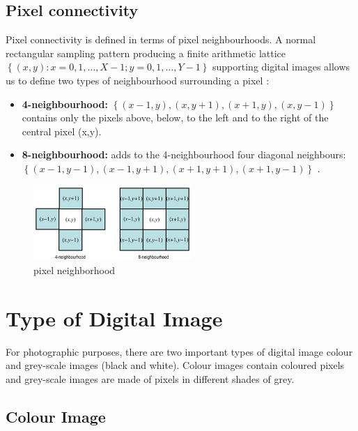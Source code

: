 \subsection{Pixel connectivity}\label{subsec:pixel-connectivity}

Pixel connectivity is defined in terms of pixel neighbourhoods.
A normal rectangular sampling pattern producing a finite arithmetic lattice
$\left\{ (x,y) : x = 0,1, \ldots ,X-1; y = 0,1,\ldots ,Y-1 \right\}$ supporting digital
images allows us to define two types of neighbourhood surrounding a pixel \cite{1.3}:

        \begin{itemize}
                \item \textbf{4-neighbourhood:} $\left\{ (x-1,y), (x,y+1), (x+1,y), (x,y-1) \right\}$ contains only the pixels above, below, to the left and to the right of the central pixel (x,y).
                \item \textbf{8-neighbourhood:} adds to the 4-neighbourhood four diagonal neighbours: $\left\{ (x-1,y-1), (x-1,y+1), (x+1,y+1), (x+1,y-1) \right\}$ .
        \end{itemize}

        \begin{figure}[h]
                \centering
                \includegraphics[width=6cm]{chapiter1/figures/neighbour.png}
                \setlength{\fboxrule}{2pt}
                \caption{pixel neighborhood}
                \label{fig:figure1.3}
        \end{figure}

\section{Type of Digital Image}\label{sec:type-of-digital-image}

For photographic purposes, there are two important types of digital image colour and grey-scale images (black and white).
Colour images contain coloured pixels and grey-scale images are made of pixels in different shades of grey.

\subsection{Colour Image}

